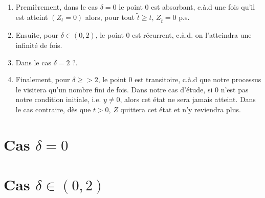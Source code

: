 \documentclass[openany]{book}
\newcommand{\1}{\mathbbm{1}}
\theoremstyle{thmfont}
\theoremstyle{deffont}
\theoremstyle{thmfont}
\theoremstyle{deffont}
\begin{document}
\begin{enumerate}
    \item Premièrement, dans le cas $\delta = 0$ le point $0$ est absorbant, c.à.d une fois qu'il est atteint $(Z_t = 0)$ alors, pour tout $\tilde t \geq t$, $Z_{\tilde t} = 0$ p.s.
    \item Ensuite, pour $\delta \in (0,2)$, le point $0$ est récurrent, c.à.d. on l'atteindra une infinité de fois.
    \item Dans le cas $\delta = 2$ {\color{purple} ?}.
    \item Finalement, pour $\delta \ge> 2$, le point $0$ est transitoire, c.à.d que notre processus le visitera qu'un nombre fini de fois. Dans notre cas d'étude, si $0$ n'est pas notre condition initiale, i.e. $y \neq 0$, alors cet état ne sera jamais atteint. Dans le cas contraire, dès que $t>0$, $Z$ quittera cet état et n'y reviendra plus.
\end{enumerate}

\section{Cas $\delta = 0$}
\section{Cas $\delta \in (0,2)$}
\end{document}
